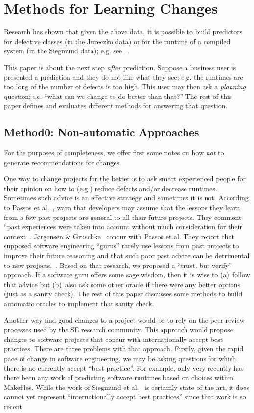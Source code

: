 \documentclass{sig-alternate}
\begin{document}
\section{Methods for Learning Changes}
Research has shown that given the above data, it is possible to build
predictors for defective classes (in the Jureczko data) or for the runtime
of a compiled system (in the Siegmund data); e.g. see ~\cite{sven12,nam13,he13,Menzies2013:local,me09b,me11f,me07b}.

This paper is about the next step {\em after} prediction. Suppose
a business user is presented a prediction and they do not like what they see; e.g. the runtimes are too long of the number of defects is too high. This user may
then ask a {\em planning}  question; i.e. ``what can we change to do better than that?'' The rest of this paper
defines and evaluates different methods for answering that question.


\subsection{Method0: Non-automatic Approaches}

For the purposes of completeness, we offer first some notes
on how  {\em not} to generate recommendations for changes.  

One way to change projects for the better is to ask smart experienced
people for their opinion on how to (e.g.) reduce defects and/or decrease runtimes. Sometimes
such advice 
is an effective strategy and sometimes it is not.
According to Passos et al.~\cite{passos11},  warn that developers
may  assume that the lessons they learn from a few past
projects are general to 
all their future projects. They comment ``past experiences were taken into account without 
much consideration for their context~\cite{passos11}.  
 J{\o}rgensen \& Gruschke~\cite{jorgensen09} concur with Passos et al. They report that 
  supposed software engineering    ``gurus'' rarely use lessons
  from past projects to improve their future reasoning and that such poor
  past advice can be detrimental to new projects.~\cite{jorgensen09}.
  Based on that research, we proposed a ``trust, but verify'' approach.
  If a software guru offers some sage wisdom, then it is wise to (a)~follow that
  advice but (b)~also ask some other oracle if there were any better options
  (just as a sanity check).
  The rest of this paper discusses some methods to build automatic oracles 
  to implement that   sanity check.
  
Another way find good changes to a project
would be to rely
on the peer review processes used by the 
SE research community. This approach would propose changes to software
projects that concur with internationally accept best practices. There are three
problems with that approach. Firstly, given the rapid pace of change in software
engineering, we may be asking questions for which there is no currently accept
``best practice''. For example, only very recently has there been any work
of predicting software runtimes based on choices within Makefiles. While the work
of Siegmund et al.~\cite{sven12} is certainly state of the art, it does
cannot yet represent ``internationally accept best practices'' since that work is so
recent. 
\end{document}
